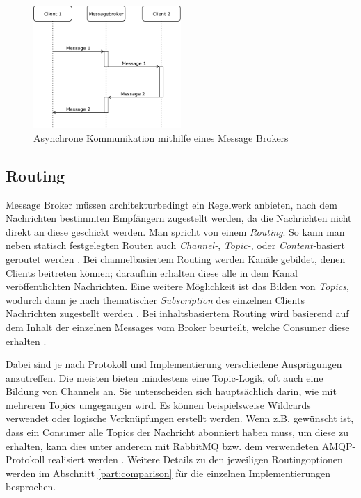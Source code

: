 \begin{figure}[h]
  \centering
    \includegraphics[width=0.5\textwidth]{figures/communication.pdf}
  \caption{Asynchrone Kommunikation mithilfe eines Message Brokers}
  \label{Message Broker:communication}
\end{figure}

\subsection{Routing}
\label{definition:routing}
Message Broker müssen architekturbedingt ein Regelwerk anbieten, nach dem Nachrichten
bestimmten Empfängern zugestellt werden, da die Nachrichten nicht direkt an diese
geschickt werden. Man spricht von einem \textit{Routing}.
So kann man neben statisch festgelegten Routen auch \textit{Channel-},
\textit{Topic-}, oder \textit{Content-}basiert geroutet werden \cite{tanenbaum2007distributed}.
Bei channelbasiertem Routing werden Kanäle gebildet, denen Clients beitreten können;
daraufhin erhalten diese alle in dem Kanal veröffentlichten Nachrichten.
Eine weitere Möglichkeit ist das Bilden von \textit{Topics}, wodurch dann je
nach thematischer \textit{Subscription} des einzelnen Clients Nachrichten zugestellt werden
\cite{eugster2003many}.
Bei inhaltsbasiertem Routing wird basierend auf dem Inhalt der einzelnen Messages vom
Broker beurteilt, welche Consumer diese erhalten \cite{tanenbaum2007distributed}.

Dabei sind je nach Protokoll und Implementierung verschiedene Ausprägungen anzutreffen.
Die meisten bieten mindestens eine Topic-Logik, oft auch eine Bildung von Channels an.
Sie unterscheiden sich hauptsächlich darin, wie mit mehreren Topics umgegangen wird.
Es können beispielsweise Wildcards verwendet oder logische Verknüpfungen
erstellt werden.
Wenn z.B. gewünscht ist, dass ein Consumer alle Topics der Nachricht 
abonniert haben muss, um diese zu erhalten, kann dies unter anderem mit
RabbitMQ bzw. dem verwendeten AMQP-Protokoll realisiert werden \cite{dobbelaere2017kafka}.
Weitere Details zu den jeweiligen Routingoptionen werden im Abschnitt
\ref{part:comparison} für die einzelnen Implementierungen besprochen.


